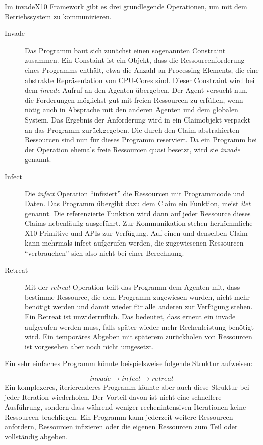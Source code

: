 Im invadeX10 Framework gibt es drei grundlegende Operationen, um mit dem Betriebssystem zu kommunizieren.
\begin{description}
	\item[Invade] Das Programm baut sich zunächst einen sogenannten Constraint zusammen. Ein Constaint ist ein Objekt, dass die Ressourcenforderung eines Programms enthält, etwa die Anzahl an Processing Elements, die eine abstrakte Repräsentation von CPU-Cores sind. Dieser Constraint wird bei dem \textit{invade} Aufruf an den Agenten übergeben. Der Agent versucht nun, die Forderungen möglichst gut mit freien Ressourcen zu erfüllen, wenn nötig auch in Absprache mit den anderen Agenten und dem globalen System. Das Ergebnis der Anforderung wird in ein Claimobjekt verpackt an das Programm zurückgegeben. Die durch den Claim abstrahierten Ressourcen sind nun für dieses Programm reserviert. Da ein Programm bei der Operation ehemals freie Ressourcen quasi besetzt, wird sie \textit{invade} genannt.
	\item[Infect] Die \textit{infect} Operation \enquote{infiziert} die Ressourcen mit Programmcode und Daten. Das Programm übergibt dazu dem Claim ein Funktion, meist \textit{ilet} genannt. Die referenzierte Funktion wird dann auf jeder Ressource dieses Claims nebenläufig ausgeführt. Zur Kommunikation stehen herkömmliche X10 Primitive und APIs zur Verfügung. Auf einen und denselben Claim kann mehrmals infect aufgerufen werden, die zugewiesenen Ressourcen \enquote{verbrauchen} sich also nicht bei einer Berechnung.
	\item[Retreat] Mit der \textit{retreat} Operation teilt das Programm dem Agenten mit, dass bestimme Ressource, die dem Programm zugewiesen wurden, nicht mehr benötigt werden und damit wieder für alle anderen zur Verfügung stehen. Ein Retreat ist unwiderruflich. Das bedeutet, dass erneut ein invade aufgerufen werden muss, falls später wieder mehr Rechenleistung benötigt wird. Ein temporäres Abgeben mit späterem zurückholen von Ressourcen ist vorgesehen aber noch nicht umgesetzt.
\end{description}

Ein sehr einfaches Programm könnte beispielsweise folgende Struktur aufweisen:

$$\mathit{invade}\rightarrow\mathit{infect}\rightarrow\mathit{retreat}$$
Ein komplexeres, iterierenderes Programm könnte aber auch diese Struktur bei jeder Iteration wiederholen. Der Vorteil davon ist nicht eine schnellere Ausführung, sondern dass während weniger rechenintensiven Iterationen keine Ressourcen brachliegen. Ein Programm kann jederzeit weitere Ressourcen anfordern, Ressourcen infizieren oder die eigenen Ressourcen zum Teil oder vollständig abgeben. 
